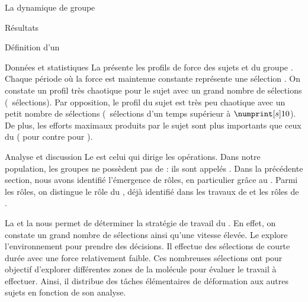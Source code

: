 \documentclass[myfrancais,ngerman,english,french]{mythesis}
\begin{document}
\begin{mychapter}{La dynamique de groupe}
\begin{mysection}{Résultats}
\begin{mysubsection}{Définition d'un }
\begin{mysubsubsection}{Données et statistiques}
					La  présente les profils de force  des sujets  et  du groupe .
					Chaque période où la force est maintenue constante représente une sélection .
					On constate un profil très chaotique pour le sujet  avec un grand nombre de sélections (~sélections).
					Par opposition, le profil du sujet  est très peu chaotique avec un petit nombre de sélections (~sélections d'un temps supérieur à $\mynum[s]{10}$).
					De plus, les efforts maximaux produits par le sujet  sont plus importants que ceux du  ( pour  contre  pour ).
				\end{mysubsubsection}
				\begin{mysubsubsection}{Analyse et discussion}
					Le  est celui qui dirige les opérations.
					Dans notre population, les groupes ne possèdent \myapriori pas de  : ils sont appelés \og {} \fg {}.
					Dans la précédente section, nous avons identifié l'émergence de rôles, en particulier grâce au \mybrainstorming.
					Parmi les rôles, on distingue le rôle du , déjà identifié dans les travaux de  et les rôles de .

					La  et la  nous permet de déterminer la stratégie de travail du .
					En effet, on constate un grand nombre de sélections ainsi qu'une vitesse élevée.
					Le  explore l'environnement pour prendre des décisions.
					Il effectue des sélections de courte durée avec une force relativement faible.
					Ces nombreuses sélections ont pour objectif d'explorer différentes zones de la molécule pour évaluer le travail à effectuer.
					Ainsi, il distribue des tâches élémentaires de déformation aux autres sujets en fonction de son analyse.


\end{mysubsubsection}
\end{mysubsection}
\end{mysection}
\end{mychapter}
\end{document}
